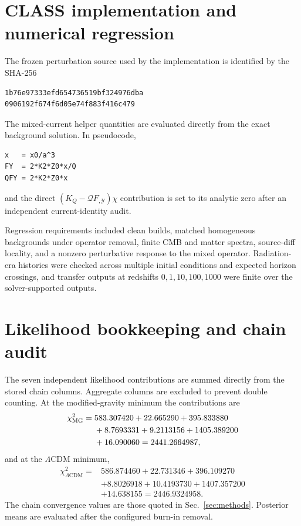 \documentclass[aps,prd,twocolumn,superscriptaddress,nofootinbib,longbibliography,floatfix]{revtex4-2}
\newcommand{\LCDM}{\Lambda\mathrm{CDM}}
\newcommand{\Y}{\mathcal{Y}}
\newcommand{\Q}{\mathcal{Q}}
\begin{document}
\section{CLASS implementation and numerical regression}\label{app:class}
The frozen perturbation source used by the implementation is identified by the SHA-256
\begin{verbatim}
1b76e97333efd654736519bf324976dba
0906192f674f6d05e74f883f416c479
\end{verbatim}
The mixed-current helper quantities are evaluated directly from the exact background solution. In pseudocode,
\begin{verbatim}
x   = x0/a^3
FY  = 2*K2*Z0*x/Q
QFY = 2*K2*Z0*x
\end{verbatim}
and the direct $(K_Q-\Q F_{,\Y})\chi$ contribution is set to its analytic zero after an independent current-identity audit.

Regression requirements included clean builds, matched homogeneous backgrounds under operator removal, finite CMB and matter spectra, source-diff locality, and a nonzero perturbative response to the mixed operator. Radiation-era histories were checked across multiple initial conditions and expected horizon crossings, and transfer outputs at redshifts $0,1,10,100,1000$ were finite over the solver-supported outputs.

\section{Likelihood bookkeeping and chain audit}\label{app:likelihood}
The seven independent likelihood contributions are summed directly from the stored chain columns. Aggregate columns are excluded to prevent double counting. At the modified-gravity minimum the contributions are
\begin{align}
\chi^2_{\rm MG}={}&583.307420+22.665290+395.833880\nonumber\\
&+8.7693331+9.2113156+1405.389200\nonumber\\
&+16.090060=2441.2664987,
\end{align}
and at the $\LCDM$ minimum,
\begin{align}
\chi^2_{\LCDM}={}&586.874460+22.731346+396.109270\nonumber\\
&+8.8026918+10.4193730+1407.357200\nonumber\\
&+14.638155=2446.9324958.
\end{align}
The chain convergence values are those quoted in Sec.~\ref{sec:methods}. Posterior means are evaluated after the configured burn-in removal.
\end{document}
